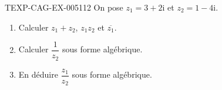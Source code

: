 \begin{exercice}{TEXP-CAG-EX-005}{1}{12}
On pose $z_1=3+2\mathrm{i}$ et $z_2=1-4\mathrm{i}$.
\begin{enumerate}
  \item Calculer $z_1+z_2$, $z_1z_2$ et $\overline{z_1}$.
  \item Calculer $\dfrac{1}{z_2}$ sous forme algébrique.
  \item En déduire $\dfrac{z_1}{z_2}$ sous forme algébrique.
\end{enumerate}
\end{exercice}
